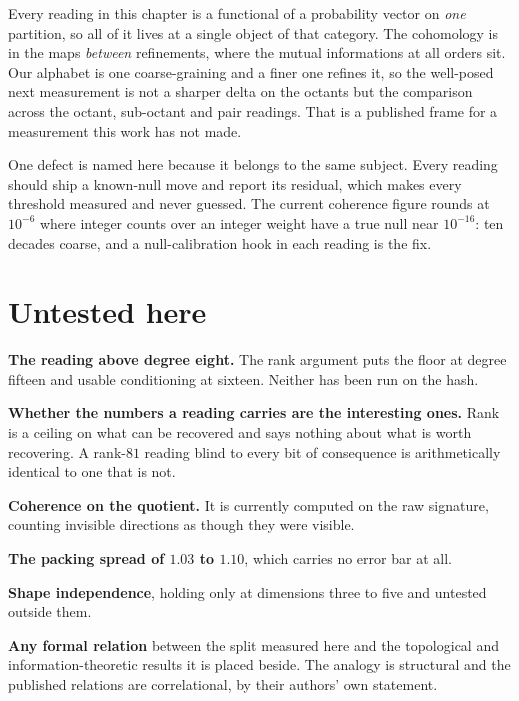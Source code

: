 Every reading in this chapter is a functional of a probability vector on \emph{one} partition, so all of it lives at a single object of that category. The cohomology is in the maps \emph{between} refinements, where the mutual informations at all orders sit. Our alphabet is one coarse-graining and a finer one refines it, so the well-posed next measurement is not a sharper delta on the octants but the comparison across the octant, sub-octant and pair readings. That is a published frame for a measurement this work has not made.

One defect is named here because it belongs to the same subject. Every reading should ship a known-null move and report its residual, which makes every threshold measured and never guessed. The current coherence figure rounds at \(10^{-6}\) where integer counts over an integer weight have a true null near \(10^{-16}\): ten decades coarse, and a null-calibration hook in each reading is the fix.

\section{Untested here}

\textbf{The reading above degree eight.} The rank argument puts the floor at degree fifteen and usable conditioning at sixteen. Neither has been run on the hash.

\textbf{Whether the numbers a reading carries are the interesting ones.} Rank is a ceiling on what can be recovered and says nothing about what is worth recovering. A rank-\(81\) reading blind to every bit of consequence is arithmetically identical to one that is not.

\textbf{Coherence on the quotient.} It is currently computed on the raw signature, counting invisible directions as though they were visible.

\textbf{The packing spread of \(1.03\) to \(1.10\)}, which carries no error bar at all.

\textbf{Shape independence}, holding only at dimensions three to five and untested outside them.

\textbf{Any formal relation} between the split measured here and the topological and information-theoretic results it is placed beside. The analogy is structural and the published relations are correlational, by their authors' own statement.

